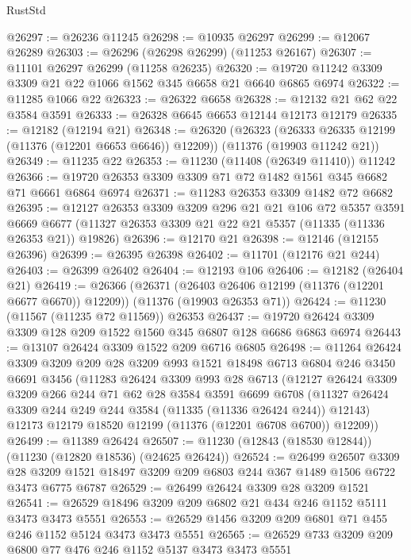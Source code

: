 \begin{lexlean}{RustStd}
\begin{coremodule}
{\begin{coremodule}
{{{{{{{{{{{{{{{{{{{{{{{{{{{{{{{{{{{{{{{{{{{{{{{{{{{{{{{{{{{{{{{{{{{{{{{{{{{{{{{{{{{{{@26297 := @26236 @11245
@26298 := @10935 @26297
@26299 := @12067 @26289
@26303 := @26296 (@26298 @26299) (@11253 @26167)
@26307 := @11101 @26297 @26299 (@11258 @26235)
@26320 := @19720 @11242 @3309 @3309 @21 @22 @1066 @1562 @345 @6658 @21 @6640 @6865 @6974
@26322 := @11285 @1066 @22
@26323 := @26322 @6658
@26328 := @12132 @21 @62 @22 @3584 @3591
@26333 := @26328 @6645 @6653 @12144 @12173 @12179
@26335 := @12182 (@12194 @21)
@26348 := @26320
    (@26323 (@26333 @26335 @12199 (@11376 (@12201 @6653 @6646)) @12209))
    (@11376 (@19903 @11242 @21))
@26349 := @11235 @22
@26353 := @11230 (@11408 (@26349 @11410)) @11242
@26366 := @19720 @26353 @3309 @3309 @71 @72 @1482 @1561 @345 @6682 @71 @6661 @6864 @6974
@26371 := @11283 @26353 @3309 @1482 @72 @6682
@26395 := @12127
    @26353
    @3309
    @3209
    @296
    @21
    @21
    @106
    @72
    @5357
    @3591
    @6669
    @6677
    (@11327 @26353 @3309 @21 @22 @21 @5357 (@11335 (@11336 @26353 @21)) @19826)
@26396 := @12170 @21
@26398 := @12146 (@12155 @26396)
@26399 := @26395 @26398
@26402 := @11701 (@12176 @21 @244)
@26403 := @26399 @26402
@26404 := @12193 @106
@26406 := @12182 (@26404 @21)
@26419 := @26366
    (@26371 (@26403 @26406 @12199 (@11376 (@12201 @6677 @6670)) @12209))
    (@11376 (@19903 @26353 @71))
@26424 := @11230 (@11567 (@11235 @72 @11569)) @26353
@26437 := @19720 @26424 @3309 @3309 @128 @209 @1522 @1560 @345 @6807 @128 @6686 @6863 @6974
@26443 := @13107 @26424 @3309 @1522 @209 @6716 @6805
@26498 := @11264
    @26424
    @3309
    @3209
    @209
    @28
    @3209
    @993
    @1521
    @18498
    @6713
    @6804
    @246
    @3450
    @6691
    @3456
    (@11283
      @26424
      @3309
      @993
      @28
      @6713
      (@12127
        @26424
        @3309
        @3209
        @266
        @244
        @71
        @62
        @28
        @3584
        @3591
        @6699
        @6708
        (@11327 @26424 @3309 @244 @249 @244 @3584 (@11335 (@11336 @26424 @244)) @12143)
        @12173
        @12179
        @18520
        @12199
        (@11376 (@12201 @6708 @6700))
        @12209))
@26499 := @11389 @26424
@26507 := @11230 (@12843 (@18530 @12844)) (@11230 (@12820 @18536) (@24625 @26424))
@26524 := @26499
    @26507
    @3309
    @28
    @3209
    @1521
    @18497
    @3209
    @209
    @6803
    @244
    @367
    @1489
    @1506
    @6722
    @3473
    @6775
    @6787
@26529 := @26499 @26424 @3309 @28 @3209 @1521
@26541 := @26529 @18496 @3209 @209 @6802 @21 @434 @246 @1152 @5111 @3473 @3473 @5551
@26553 := @26529 @1456 @3209 @209 @6801 @71 @455 @246 @1152 @5124 @3473 @3473 @5551
@26565 := @26529 @733 @3209 @209 @6800 @77 @476 @246 @1152 @5137 @3473 @3473 @5551
}}}}}}}}}}}}}}}}}}}}}}}}}}}}}}}}}}}}}}}}}}}}}}}}}}}}}}}}}}}}}}}}}}}}}}}}}}}}}}}}}}}}}
\end{coremodule}}
\end{coremodule}
\end{lexlean}

